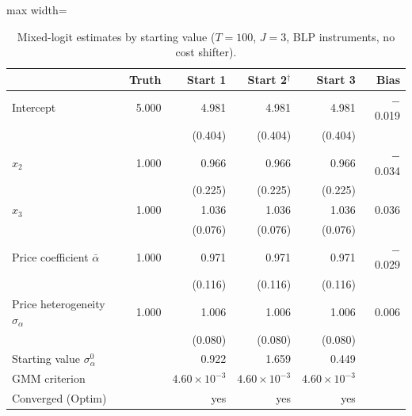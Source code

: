 \begin{table}[H]
\centering\small
\caption{Mixed-logit estimates by starting value ($T=100$, $J=3$, BLP instruments, no cost shifter).}\label{tab:q8c_estimates}
\begin{adjustbox}{max width=\linewidth}
\begin{tabular}{lrrrrr}
\toprule
 & Truth & Start 1 & Start 2$^{\dagger}$ & Start 3 & Bias \\
\midrule
Intercept & 5.000 & 4.981 & 4.981 & 4.981 & $-$0.019 \\
 &  & (0.404) & (0.404) & (0.404) &  \\
$x_{2}$ & 1.000 & 0.966 & 0.966 & 0.966 & $-$0.034 \\
 &  & (0.225) & (0.225) & (0.225) &  \\
$x_{3}$ & 1.000 & 1.036 & 1.036 & 1.036 & 0.036 \\
 &  & (0.076) & (0.076) & (0.076) &  \\
Price coefficient $\bar\alpha$ & 1.000 & 0.971 & 0.971 & 0.971 & $-$0.029 \\
 &  & (0.116) & (0.116) & (0.116) &  \\
Price heterogeneity $\sigma_\alpha$ & 1.000 & 1.006 & 1.006 & 1.006 & 0.006 \\
 &  & (0.080) & (0.080) & (0.080) &  \\
\midrule
Starting value $\sigma_\alpha^{0}$ & & 0.922 & 1.659 & 0.449 & \\
GMM criterion & & $4.60\times 10^{-3}$ & $4.60\times 10^{-3}$ & $4.60\times 10^{-3}$ & \\
Converged (Optim) & & yes & yes & yes & \\
\bottomrule
\end{tabular}
\end{adjustbox}
\par{}
\end{table}
